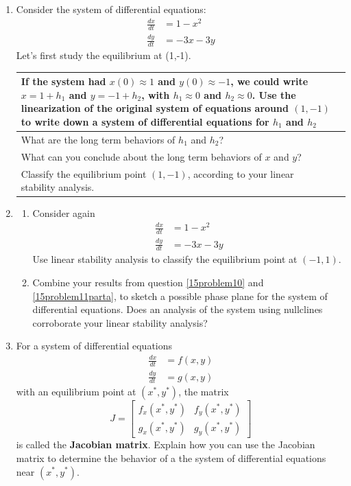 \begin{enumerate}[resume]
\item Consider the system of differential equations:
\begin{align*}
\frac{dx}{dt} &= 1-x^2 \\
\frac{dy}{dt} &= -3x -3y
\end{align*}
Let's first study the equilibrium at (1,-1). \label{15problem10}

\begin{tabular}{|p{2.5in}|p{3in}|}
\hline
If the system had $x(0) \approx 1$ and $y(0) \approx -1$, we could write $x=1+h_1$ and $y=-1+h_2$, with $h_1 \approx 0$ and $h_2 \approx 0$. Use the linearization of the original system of equations around $(1,-1)$ to write down a system of differential equations for $h_1$ and $h_2$ \vspace{1.5in} &  \\ \hline
What are the long term behaviors of $h_1$ and $h_2$? \vfill &  \\ \hline
What can you conclude about the long term behaviors of $x$ and $y$? \vfill &  \\ \hline
Classify the equilibrium point $(1,-1)$, according to your linear stability analysis. \vfill &  \\ \hline
\end{tabular}

\clearpage

\item \label{15problem11}
\begin{enumerate}
\item Consider again
\begin{align*}
\frac{dx}{dt} &= 1-x^2 \\
\frac{dy}{dt} &= -3x -3y
\end{align*}
Use linear stability analysis to classify the equilibrium point at $(-1,1)$. \label{15problem11parta} \vfill
\item Combine your results from question \ref{15problem10} and \ref{15problem11parta}, to sketch a possible phase plane for the system of differential equations. Does an analysis of the system using nullclines corroborate your linear stability analysis? \label{15problem11partb} \vfill
\end{enumerate}

\clearpage

\item For a system of differential equations
\begin{align*}
\frac{dx}{dt} &= f(x,y) \\
\frac{dy}{dt} &= g(x,y)
\end{align*}
with an equilibrium point at $(x^*,y^*)$, the matrix
\[
J =
\begin{bmatrix}
f_x(x^*,y^*) & f_y(x^*,y^*) \\
g_x(x^*,y^*) & g_y(x^*,y^*)
\end{bmatrix}
\]
is called the \textbf{Jacobian matrix}. Explain how you can use the Jacobian matrix to determine the behavior of a the system of differential equations near $(x^*,y^*)$. \label{15problem12} \vfill


\end{enumerate}
